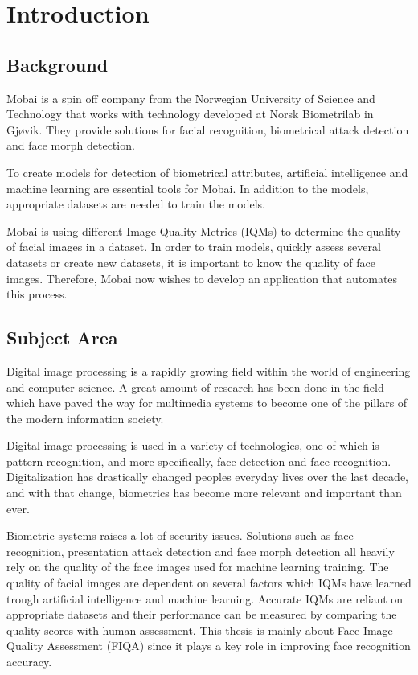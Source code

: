 \chapter{Introduction}

\section{Background}
Mobai is a spin off company from the Norwegian University of Science and Technology that works with technology developed at Norsk Biometrilab in Gjøvik. They provide solutions for facial recognition, biometrical attack detection and face morph detection. 

To create models for detection of biometrical attributes, artificial intelligence and machine learning are essential tools for Mobai. In addition to the models, appropriate datasets are needed to train the models. 

Mobai is using different Image Quality Metrics (IQMs) to determine the quality of facial images in a dataset. In order to train models, quickly assess several datasets or create new datasets, it is important to know the quality of face images. Therefore, Mobai now wishes to develop an application that automates this process. 


\section{Subject Area}
Digital image processing is a rapidly growing field within the world of engineering and computer science. A great amount of research has been done in the field which have paved the way for multimedia systems to become one of the pillars of the modern information society.

Digital image processing is used in a variety of technologies, one of which is pattern recognition, and more specifically, face detection and face recognition. Digitalization has drastically changed peoples everyday lives over the last decade, and with that change, biometrics has become more relevant and important than ever. 

Biometric systems raises a lot of security issues. Solutions such as face recognition, presentation attack detection and face morph detection all heavily rely on the quality of the face images used for machine learning training. The quality of facial images are dependent on several factors which IQMs have learned trough artificial intelligence and machine learning. Accurate IQMs are reliant on appropriate datasets and their performance can be measured by comparing the quality scores with human assessment. This thesis is mainly about Face Image Quality Assessment (FIQA) since it plays a key role in improving face recognition accuracy. 

